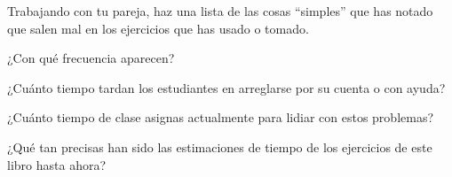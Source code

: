Trabajando con tu pareja, haz una lista de las cosas ``simples'' que has notado que salen mal en los ejercicios que has usado o tomado.

¿Con qué frecuencia aparecen?

¿Cuánto tiempo tardan los estudiantes en arreglarse por su cuenta o con ayuda?

¿Cuánto tiempo de clase asignas actualmente para lidiar con estos problemas?



¿Qué tan precisas han sido las estimaciones de tiempo de los ejercicios de este libro hasta ahora?
